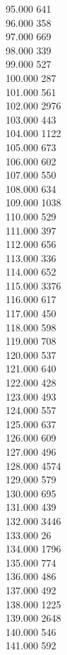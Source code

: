 { 95.000	641 \\
 96.000	358 \\
 97.000	669 \\
 98.000	339 \\
 99.000	527 \\
 100.000	287 \\
 101.000	561 \\
 102.000	2976 \\
 103.000	443 \\
 104.000	1122 \\
 105.000	673 \\
 106.000	602 \\
 107.000	550 \\
 108.000	634 \\
 109.000	1038 \\
 110.000	529 \\
 111.000	397 \\
 112.000	656 \\
 113.000	336 \\
 114.000	652 \\
 115.000	3376 \\
 116.000	617 \\
 117.000	450 \\
 118.000	598 \\
 119.000	708 \\
 120.000	537 \\
 121.000	640 \\
 122.000	428 \\
 123.000	493 \\
 124.000	557 \\
 125.000	637 \\
 126.000	609 \\
 127.000	496 \\
 128.000	4574 \\
 129.000	579 \\
 130.000	695 \\
 131.000	439 \\
 132.000	3446 \\
 133.000	26 \\
 134.000	1796 \\
 135.000	774 \\
 136.000	486 \\
 137.000	492 \\
 138.000	1225 \\
 139.000	2648 \\
 140.000	546 \\
 141.000	592 \\
}

